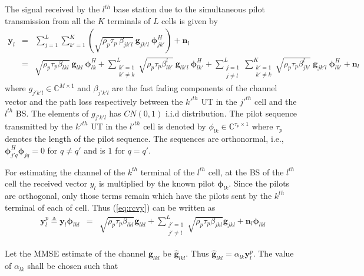 \documentclass[10pt, a4paper, twoside,fleqn]{article}
\begin{document}
The signal received by the $l^{th}$ base station due to the simultaneous pilot transmission from  all the $K$ terminals of $L$ cells is given by
\begin{eqnarray}\label{eq:rcvy}
	\pmb{y}_{l} &=& \sum_{j=1}^{L} \sum_{k'=1}^{K} (\sqrt{\rho_p \tau_p \ \beta_{jk'l}} \ \pmb{g}_{jk'l} \ \pmb{\phi}^H_{jk'})
        		    +  \pmb{n}_{l} \nonumber \\                    
    			   &=& \sqrt{\rho_p \tau_p \beta_{lkl}} \ \pmb{g}_{lkl} \ \pmb{\phi}^H_{lk}
        			+  \sum_{\substack{k'=1 \\ k' \neq k}}^{L} \sqrt{\rho_p \tau_p \beta_{lk'}^{l}} \ \pmb{g}_{lk'l} \ \pmb{\phi}^H_{lk'}
        		    +  \sum_{\substack{j=1 \\ j \neq l}}^{L} \sum_{\substack{k'=1 \\ k' \neq k}}^{K} \sqrt{\rho_p \tau_p \beta_{jk'}^{l}} \
                       \pmb{g}_{jk'l} \ \pmb{\phi}^H_{lk'}
    			    +  \pmb{n}_{l}
\end{eqnarray}
where $g_{j'k'l} \in {\mathbb C}^{M \times 1}$  and $\beta_{j'k'l}$ are the fast fading components of the channel vector and the path loss respectively between the $k'^{th}$ UT in the $j'^{th}$ cell and the $l^{th}$ BS. The elements of $g_{j'k'l}$ has $CN(0,1)$ i.i.d distribution. The pilot sequence transmitted by the $k'^{th}$ UT in the $l'^{th}$ cell is denoted by $\phi_{lk} \in {\mathbb C}^{\tau_p \times 1}$ where $\tau_p$ denotes the length of the pilot sequence. The sequences are orthonormal, i.e., $\pmb{\phi}_{j'q}^H \pmb{\phi}_{jq} = 0$ for  $q \ne q'$ and is $1$ for $q=q'$.

For estimating the channel of the $k^{th}$ terminal of the $l^{th}$ cell, at the BS of the $l^{th}$ cell the received vector $y_{l}$ is multiplied by the known pilot $\pmb{\phi}_{lk}$. Since the pilots are orthogonal, only those terms remain which have the pilots sent by the $k^{th}$ terminal of each of cell. Thus (\ref{eq:rcvy}) can be written as
\begin{eqnarray}
	\pmb{y}_{l}^{p} \triangleq \pmb{y}_{l} \pmb{\phi}_{lkl}
                          &=&     \sqrt{\rho_p\tau_p\beta_{lkl}}\pmb{g}_{lkl}
                           +      \sum_{\substack{j'=1 \\ j' \neq l}}^{L} \sqrt{\rho_p\tau_p\beta_{jkl}}\pmb{g}_{jkl}
             			   +      \pmb{n}_{l}\pmb{\phi}_{lkl}
\end{eqnarray}

Let the MMSE estimate of the channel $\pmb{g}_{lkl}$ be $\pmb{\hat g}_{lkl}$. Thus $\pmb{\hat g}_{lkl} = \alpha_{lk}\pmb{y}_{l}^{p}$. The value of $\alpha_{lk}$ shall be chosen such that
        
\end{document}
